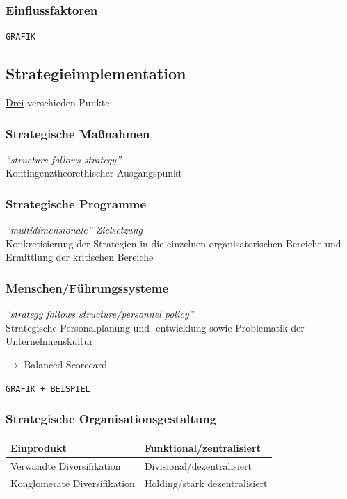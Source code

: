 \documentclass[a4paper,11pt, twoside]{article}
\begin{document}
\subsubsection*{Einflussfaktoren}

\texttt{GRAFIK}

\subsection{Strategieimplementation}
\underline{Drei} verschieden Punkte:

\subsubsection*{Strategische Maßnahmen}
\textit{"`structure follows strategy"'}\\
Kontingenztheorethischer Ausgangspunkt


\subsubsection*{Strategische Programme}
\textit{"`multidimensionale"' Zielsetzung}\\
Konkretisierung der Strategien in die einzelnen organisatorischen Bereiche und Ermittlung der kritischen Bereiche


\subsubsection*{Menschen/Führungssysteme}
\textit{"`strategy follows structure/personnel policy"'}\\
Strategische Personalplanung und -entwicklung sowie Problematik der Unternehmenskultur

$\rightarrow$ Balanced Scorecard

\texttt{GRAFIK + BEISPIEL}

\subsubsection*{Strategische Organisationsgestaltung}

\begin{tabular}{|l|l|}
\hline 
Einprodukt & Funktional/zentralisiert \\ 
\hline 
Verwandte Diversifikation & Divisional/dezentralisiert \\ 
\hline 
Konglomerate Diversifikation & Holding/stark dezentralisiert \\ 
\hline 
\end{tabular} 
\end{document}
